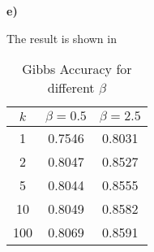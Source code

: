 \documentclass{article}
\begin{document}
\textbf{e)}

The result is shown in 

\begin{table}
\centering
\begin{tabular}{c|c|c}
\textbf{$k$} & \textbf{$\beta = 0.5$} & \textbf{$\beta=2.5$} \\\hline
1 & 0.7546 & 0.8031 \\\hline
2 & 0.8047 & 0.8527\\\hline
5 & 0.8044 & 0.8555 \\\hline
10 & 0.8049 & 0.8582 \\\hline
100 & 0.8069 & 0.8591 \\\hline
\end{tabular}
\caption{Gibbs Accuracy for different $\beta$}
\label{tab:gibbsbeta}
\end{table}
\end{document}
